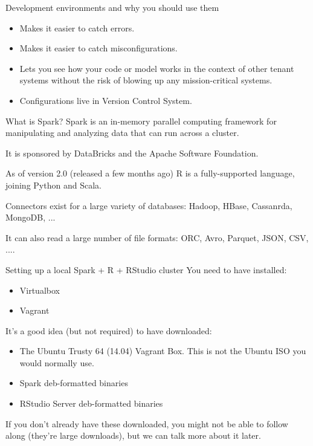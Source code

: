 \documentclass[pdf]{beamer}
\begin{document}
\begin{frame}{Development environments and why you should use them}
    \begin{itemize}
	\item Makes it easier to catch errors.
	\item Makes it easier to catch misconfigurations.
	\item Lets you see how your code or model works in the context of other tenant systems without the risk of blowing up any mission-critical systems.
	\item Configurations live in Version Control System.
    \end{itemize}
\end{frame}

\begin{frame}{What is Spark?}
    Spark is an in-memory parallel computing framework for manipulating and analyzing data that can run across a cluster.

\vspace{10pt}

    It is sponsored by DataBricks and the Apache Software Foundation.

\vspace{10pt}

    As of version 2.0 (released a few months ago) R is a fully-supported language, joining Python and Scala.

\vspace{10pt}

    Connectors exist for a large variety of databases: Hadoop, HBase, Cassanrda, MongoDB, ...

\vspace{10pt}

    It can also read a large number of file formats: ORC, Avro, Parquet, JSON, CSV, ....
\end{frame}

\begin{frame}{Setting up a local Spark + R + RStudio cluster}
    You need to have installed:
    \begin{itemize}
	\item Virtualbox
	\item Vagrant
    \end{itemize}

    It's a good idea (but not required) to have downloaded:
    \begin{itemize}
	\item The Ubuntu Trusty 64 (14.04) Vagrant Box. This is not the Ubuntu ISO you would normally use.
	\item Spark deb-formatted binaries
	\item RStudio Server deb-formatted binaries
    \end{itemize}

    If you don't already have these downloaded, you might not be able to follow along (they're large downloads), but we can talk more about it later.
\end{frame}
\end{document}
